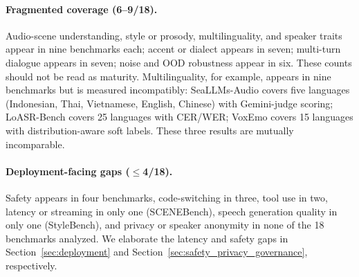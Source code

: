 \paragraph{Fragmented coverage (6--9/18).}
Audio-scene understanding, style or prosody, multilinguality, and speaker
traits appear in nine benchmarks each; accent or dialect appears in seven;
multi-turn dialogue appears in seven; noise and OOD robustness appear in
six. These counts should not be read as maturity. Multilinguality, for
example, appears in nine benchmarks but is measured incompatibly:
SeaLLMs-Audio \citep{liu2025seallmsaudio} covers five languages
(Indonesian, Thai, Vietnamese, English, Chinese) with Gemini-judge scoring;
LoASR-Bench \citep{chen2026loasrbench}
covers 25 languages with CER/WER; VoxEmo \citep{zhang2026voxemo} covers 15
languages with distribution-aware soft labels. These three results are
mutually incomparable.

\paragraph{Deployment-facing gaps ($\leq$4/18).}
Safety appears in four benchmarks, code-switching in three, tool use in
two, latency or streaming in only one (SCENEBench), speech generation
quality in only one (StyleBench), and privacy or speaker anonymity in
none of the 18 benchmarks analyzed. We elaborate the latency and safety gaps in
Section~\ref{sec:deployment} and Section~\ref{sec:safety_privacy_governance}, respectively.

